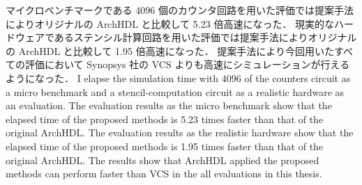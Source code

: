 マイクロベンチマークである 4096 個のカウンタ回路を用いた評価では提案手法によりオリジナルの ArchHDL と比較して 5.23 倍高速になった．
現実的なハードウェアであるステンシル計算回路を用いた評価では提案手法によりオリジナルの ArchHDL と比較して 1.95 倍高速になった．
提案手法により今回用いたすべての評価において Synopsys 社の VCS よりも高速にシミュレーションが行えるようになった．
\fi
I elapse the simulation time with 4096 of the counters circuit as a micro benchmark and a stencil-computation circuit as a realistic hardware as an evaluation.
The evaluation results as the micro benchmark show that the elapsed time of the proposed methods is 5.23 times faster than that of the original ArchHDL.
The evaluation results as the realistic hardware show that the elapsed time of the proposed methods is 1.95 times faster than that of the original ArchHDL.
The results show that ArchHDL applied the proposed methods can perform faster than VCS in the all evaluations in this thesis.